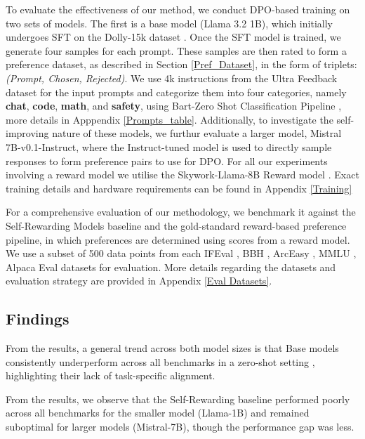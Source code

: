 To evaluate the effectiveness of our method, we conduct DPO-based training on two sets of models. The first is a base model (Llama 3.2 1B), which initially undergoes SFT on the Dolly-15k dataset \citep{DatabricksBlog2023DollyV2}. Once the SFT model is trained, we generate four samples for each prompt. These samples are then rated to form a preference dataset, as described in Section \ref{Pref_Dataset}, in the form of triplets: \textit{(Prompt, Chosen, Rejected)}. We use 4k instructions from the Ultra Feedback dataset \citep{cui2023ultrafeedback} for the input prompts and categorize them into four categories, namely \textbf{chat}, \textbf{code}, \textbf{math}, and \textbf{safety}, using Bart-Zero Shot Classification Pipeline \citep{DBLP:journals/corr/abs-1910-13461,ott2019fairseq}, more details in Apppendix \ref{Prompts_table}. Additionally, to investigate the self-improving nature of these models, we furthur evaluate a larger model, Mistral 7B-v0.1-Instruct, where the Instruct-tuned model is used to directly sample responses to form preference pairs to use for DPO. For all our experiments involving a reward model we utilise the Skywork-Llama-8B Reward model \citep{liu2024skywork}. Exact training details and hardware requirements can be found in Appendix \ref{Training}

For a comprehensive evaluation of our methodology, we benchmark it against the Self-Rewarding Models baseline \citep{yuan2024selfrewarding} and the gold-standard reward-based preference pipeline, in which preferences are determined using scores from a reward model. We use a subset of 500 data points from each IFEval \citep{zhou2023instruction}, BBH \citep{suzgun2022challenging}, ArcEasy \citep{clark2018think}, MMLU \citep{hendrycks2020measuring}, Alpaca Eval \citep{dubois2024length} datasets for evaluation. More details regarding the datasets and evaluation strategy are provided in Appendix \ref{Eval Datasets}.  

\subsection{Findings}
From the results, a general trend across both model sizes is that Base models consistently underperform across all benchmarks in a zero-shot setting \citep{kojima2022large}, highlighting their lack of task-specific alignment. 

From the results, we observe that the Self-Rewarding baseline performed poorly across all benchmarks for the smaller model (Llama-1B) and remained suboptimal for larger models (Mistral-7B), though the performance gap was less.

